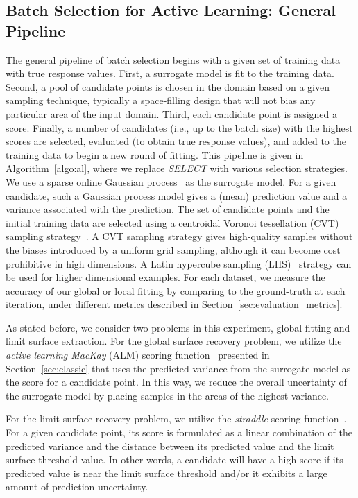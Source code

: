 \subsection{Batch Selection for Active Learning: General Pipeline}
The general pipeline of batch selection begins with a given set of training data with true response values.
%
First, a surrogate model is fit to the training data.
%
Second, a pool of candidate points is chosen in the domain based on a given sampling technique, typically a space-filling design that will not bias any particular area of the input domain.
%
Third, each candidate point is assigned a score.
%
Finally, a number of candidates (i.e., up to the batch size) with the highest scores are selected, evaluated (to obtain true response values), and added to the training data to begin a new round of fitting.
%
This pipeline is given in Algorithm~\ref{algo:al}, where we replace \textit{SELECT} with various selection strategies.
%
We use a sparse online Gaussian process~\cite{CsatoOpper2002} as the surrogate model.
%
For a given candidate, such a Gaussian process model gives a (mean) prediction value and a variance associated with the prediction.
%
The set of candidate points and the initial training data are selected using a centroidal Voronoi tessellation (CVT) sampling strategy~\cite{DuFaberGunzburger1999}.
%
A CVT sampling strategy gives high-quality samples without the biases introduced by a uniform grid sampling, although it can become cost prohibitive in high dimensions.
%
A Latin hypercube sampling (LHS)~\cite{ImanDavenportZeigler1980} strategy can be used for higher dimensional examples.
%
For each dataset, we measure the accuracy of our global or local fitting by comparing to the ground-truth at each iteration, under different metrics described in Section~\ref{sec:evaluation_metrics}.

As stated before, we consider two problems in this experiment, global fitting and limit surface extraction.
%
For the global surface recovery problem, we utilize the \emph{active learning MacKay} (ALM) scoring function~\cite{MacKay1992} presented in Section~\ref{sec:classic} that uses the predicted variance from the surrogate model as the score for a candidate point.
%
In this way, we reduce the overall uncertainty of the surrogate model by placing samples in the areas of the highest variance.

For the limit surface recovery problem, we utilize the \emph{straddle} scoring function~\cite{BryanSchneiderNichol2005}.
%
For a given candidate point, its score is formulated as a linear combination of the predicted variance and the distance between its predicted value and the limit surface threshold value.
%
In other words, a candidate will have a high score if its predicted value is near the limit surface threshold and/or it exhibits a large amount of prediction uncertainty.

